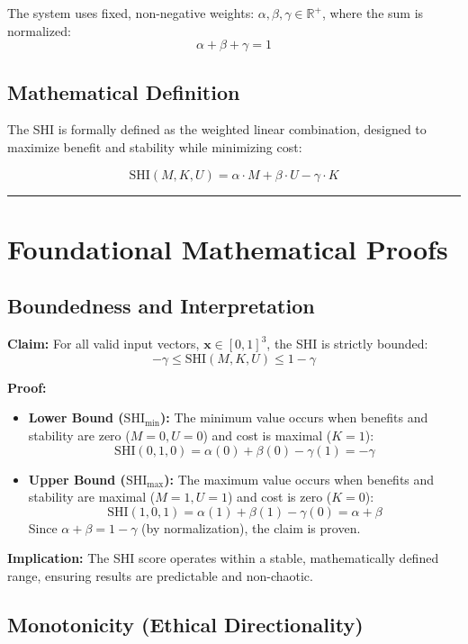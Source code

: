 \documentclass[12pt, a4paper]{article}
\begin{document}
The system uses fixed, non-negative weights: $\alpha, \beta, \gamma \in \mathbb{R}^+$, where the sum is normalized:
$$\alpha + \beta + \gamma = 1$$

\subsection{Mathematical Definition}

The SHI is formally defined as the weighted linear combination, designed to maximize benefit and stability while minimizing cost:

$$
\boxed{
\text{SHI}(M,K,U) = \alpha \cdot M + \beta \cdot U - \gamma \cdot K
}
$$

\hrule

\section{Foundational Mathematical Proofs}

\subsection{Boundedness and Interpretation}

\textbf{Claim:} For all valid input vectors, $\mathbf{x} \in [0, 1]^3$, the SHI is strictly bounded:
$$-\gamma \leq \text{SHI}(M,K,U) \leq 1 - \gamma$$

\textbf{Proof:}
\begin{itemize}
    \item \textbf{Lower Bound ($\text{SHI}_{\min}$):} The minimum value occurs when benefits and stability are zero ($M=0, U=0$) and cost is maximal ($K=1$):
    $$\text{SHI}(0,1,0) = \alpha(0) + \beta(0) - \gamma(1) = -\gamma$$
    \item \textbf{Upper Bound ($\text{SHI}_{\max}$):} The maximum value occurs when benefits and stability are maximal ($M=1, U=1$) and cost is zero ($K=0$):
    $$\text{SHI}(1,0,1) = \alpha(1) + \beta(1) - \gamma(0) = \alpha + \beta$$
    Since $\alpha + \beta = 1 - \gamma$ (by normalization), the claim is proven.
\end{itemize}
\textbf{Implication:} The SHI score operates within a stable, mathematically defined range, ensuring results are predictable and non-chaotic.

\subsection{Monotonicity (Ethical Directionality)}
\end{document}
